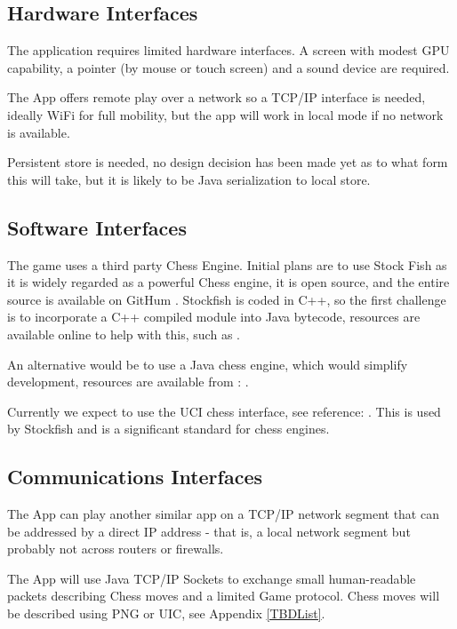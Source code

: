 \documentclass[a4paper,10pt]{article}
\begin{document}
\subsection{Hardware Interfaces}

The application requires limited hardware interfaces. A screen with modest GPU capability, a pointer (by mouse or touch screen) and a sound device are required. 

The App offers remote play over a network so a TCP/IP interface  is needed, ideally WiFi for full mobility, but the app will work in local mode if no network is available. 

Persistent store is needed, no design decision has been made yet as to what form this will take, but it is likely to be Java serialization to local store. 

\subsection{Software Interfaces}


The game uses a third party Chess Engine. Initial plans are to use Stock Fish \cite{stockfish}
as it is widely regarded as a powerful Chess engine, it is open source, and the entire source is available on GitHum \cite{stockfish-github}. Stockfish is coded in C++, so the first challenge is to incorporate a C++ compiled module into Java bytecode, resources are available online to help with this, such as \cite{javaStockfish}. 

An alternative would be to use a Java chess engine, which would simplify development, resources are available from : \cite{javaChess}.

Currently we expect to use the UCI chess interface, see reference: \cite{UCIInterface}. This is used by Stockfish and is a significant standard for chess engines. 

\subsection{Communications Interfaces}

The App can play another similar app on a TCP/IP network segment that can be addressed by a direct IP address - that is, a local network segment but probably not across routers or firewalls.

The App will use Java TCP/IP Sockets to exchange small human-readable packets describing Chess moves and a limited Game protocol. Chess moves will be described using PNG or UIC, see Appendix \ref{TBDList}. 
\end{document}
